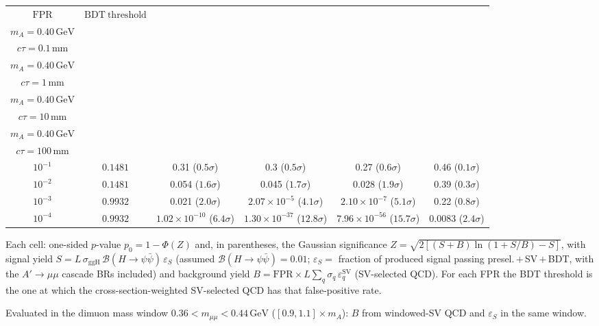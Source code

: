\documentclass[10pt,a4paper]{article}
\begin{document}
{\begin{tabular}{cccccc}
\toprule
$\mathrm{FPR}$ & $\mathrm{BDT\ threshold}$ & \shortstack{$m_{\pi}=4\,\mathrm{GeV}$\\$m_{A}=0.40\,\mathrm{GeV}$\\$c\tau=0.1\,\mathrm{mm}$} & \shortstack{$m_{\pi}=4\,\mathrm{GeV}$\\$m_{A}=0.40\,\mathrm{GeV}$\\$c\tau=1\,\mathrm{mm}$} & \shortstack{$m_{\pi}=4\,\mathrm{GeV}$\\$m_{A}=0.40\,\mathrm{GeV}$\\$c\tau=10\,\mathrm{mm}$} & \shortstack{$m_{\pi}=4\,\mathrm{GeV}$\\$m_{A}=0.40\,\mathrm{GeV}$\\$c\tau=100\,\mathrm{mm}$} \\
\midrule
$10^{-1}$ & $0.1481$ & 0.31 ($0.5\sigma$) & 0.3 ($0.5\sigma$) & 0.27 ($0.6\sigma$) & 0.46 ($0.1\sigma$)\\
$10^{-2}$ & $0.1481$ & 0.054 ($1.6\sigma$) & 0.045 ($1.7\sigma$) & 0.028 ($1.9\sigma$) & 0.39 ($0.3\sigma$)\\
$10^{-3}$ & $0.9932$ & 0.021 ($2.0\sigma$) & $2.07\times10^{-5}$ ($4.1\sigma$) & $2.10\times10^{-7}$ ($5.1\sigma$) & 0.22 ($0.8\sigma$)\\
$10^{-4}$ & $0.9932$ & $1.02\times10^{-10}$ ($6.4\sigma$) & $1.30\times10^{-37}$ ($12.8\sigma$) & $7.96\times10^{-56}$ ($15.7\sigma$) & 0.0083 ($2.4\sigma$)\\
\bottomrule
\end{tabular}

{\small Each cell: one-sided $p$-value $p_0=1-\Phi(Z)$ and, in parentheses, the Gaussian significance $Z=\sqrt{2\left[(S{+}B)\ln(1{+}S/B)-S\right]}$, with signal yield $S=L\,\sigma_{\mathrm{ggH}}\,\mathcal{B}(H\to\psi\bar{\psi})\,\varepsilon_S$ (assumed $\mathcal{B}(H\to\psi\bar{\psi})=0.01$; $\varepsilon_S=$ fraction of produced signal passing presel.\,$+$\,SV\,$+$\,BDT, with the $A'\to\mu\mu$ cascade BRs included) and background yield $B=\mathrm{FPR}\times L\sum_q\sigma_q\,\varepsilon_q^{\mathrm{SV}}$ (SV-selected QCD). For each FPR the BDT threshold is the one at which the cross-section-weighted SV-selected QCD has that false-positive rate.}

{\small Evaluated in the dimuon mass window $0.36<m_{\mu\mu}<0.44\,\mathrm{GeV}$ ($[0.9,1.1]\times m_A$): $B$ from windowed-SV QCD and $\varepsilon_S$ in the same window.}

}\clearpage
\end{document}
